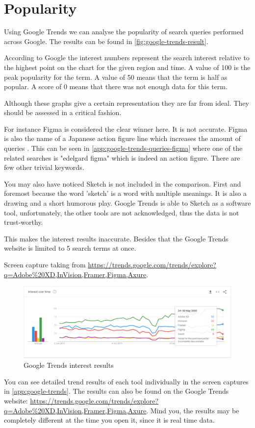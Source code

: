 \section{Popularity}
Using Google Trends we can analyse the popularity of search queries performed across Google. The results can be found in \autoref{fig:google-trends-result}.

According to Google the interest numbers represent the search interest relative to the highest point on the chart for the given region and time. A value of 100 is the peak popularity for the term. A value of 50 means that the term is half as popular. A score of 0 means that there was not enough data for this term.

Although these graphs give a certain representation they are far from ideal. They should be assessed in a critical fashion.

For instance Figma is considered the clear winner here. It is not accurate. Figma is also the name of a Japanese action figure line which increases the amount of queries . This can be seen in \autoref{app:google-trends-queries-figma} where one of the related searches is "edelgard figma" which is indeed an action figure. There are few other trivial keywords.

You may also have noticed Sketch is not included in the comparison. First and foremost because the word 'sketch' is a word with multiple meanings. It is also a drawing and a short humorous play. Google Trends is able to Sketch as a software tool, unfortunately, the other tools are not acknowledged, thus the data is not trust-worthy.

This makes the interest results inaccurate. Besides that the Google Trends website is limited to 5 search terms at once.

 Screen capture taking from \url{https://trends.google.com/trends/explore?q=Adobe\%20XD,InVision,Framer,Figma,Axure}.
\begin{figure}[H]
    \centering
    \includegraphics[scale=0.45]{figures/trends/google-trends.png}
    \caption{Google Trends interest results}
    \label{fig:google-trends-result}
\end{figure}
   
You can see detailed trend results of each tool individually in the screen captures in \autoref{app:google-trends}.
The results can also be found on the Google Trends website:  \url{https://trends.google.com/trends/explore?q=Adobe\%20XD,InVision,Framer,Figma,Axure}. Mind you, the results may be completely different at the time you open it, since it is real time data.


